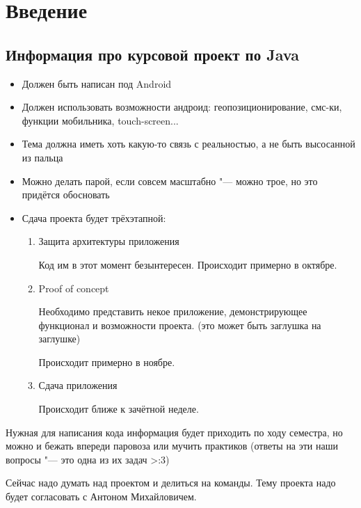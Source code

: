 \chapter{Введение}

\section{Информация про курсовой проект по Java}

\begin{itemize}
	\item Должен быть написан под Android
		
	\item Должен использовать возможности андроид: геопозиционирование, смс-ки, функции мобильника, touch-screen...

	\item Тема должна иметь хоть какую-то связь с реальностью, а не быть высосанной из пальца
	
	\item Можно делать парой, если совсем масштабно "--- можно трое, но это придётся обосновать

	\item Сдача проекта будет трёхэтапной:
		\begin{enumerate}
			\item Защита архитектуры приложения
			
				Код им в этот момент безынтересен.
				Происходит примерно в октябре.
		
			\item Proof of concept
		
				Необходимо представить некое приложение, демонстрирующее функционал и возможности проекта.
				(это может быть заглушка на заглушке)
		
				Происходит примерно в ноябре.
		
			\item Сдача приложения

				Происходит ближе к зачётной неделе.
		\end{enumerate}
\end{itemize}

Нужная для написания кода информация будет приходить по ходу семестра, 
но можно и бежать впереди паровоза или мучить практиков
(ответы на эти наши вопросы "--- это одна из их задач >:3)

Сейчас надо думать над проектом и делиться на команды.
Тему проекта надо будет согласовать с Антоном Михайловичем.

